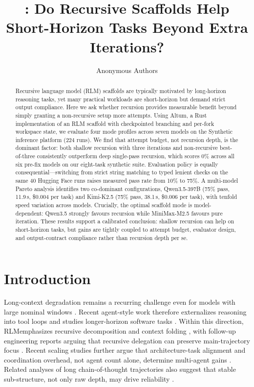 \documentclass[11pt]{article}
\title{\altum: Do Recursive Scaffolds Help Short-Horizon Tasks Beyond Extra Iterations?}
\author{Anonymous Authors}
\date{}
\newcommand{\rlm}{RLM}
\begin{document}
\maketitle

\begin{abstract}
Recursive language model (RLM) scaffolds are typically motivated by long-horizon reasoning tasks, yet many practical workloads are short-horizon but demand strict output compliance. Here we ask whether recursion provides measurable benefit beyond simply granting a non-recursive setup more attempts. Using Altum, a Rust implementation of an RLM scaffold with checkpointed branching and per-fork workspace state, we evaluate four mode profiles across seven models on the Synthetic inference platform (224 runs). We find that attempt budget, not recursion depth, is the dominant factor: both shallow recursion with three iterations and non-recursive best-of-three consistently outperform deep single-pass recursion, which scores 0\% across all six pre-fix models on our eight-task synthetic suite. Evaluation policy is equally consequential---switching from strict string matching to typed lenient checks on the same 40 Hugging Face runs raises measured pass rate from 10\% to 75\%. A multi-model Pareto analysis identifies two co-dominant configurations, Qwen3.5-397B (75\% pass, 11.9\,s, \$0.004 per task) and Kimi-K2.5 (75\% pass, 38.1\,s, \$0.006 per task), with tenfold speed variation across models. Crucially, the optimal scaffold mode is model-dependent: Qwen3.5 strongly favours recursion while MiniMax-M2.5 favours pure iteration. These results support a calibrated conclusion: shallow recursion can help on short-horizon tasks, but gains are tightly coupled to attempt budget, evaluator design, and output-contract compliance rather than recursion depth per se.
\end{abstract}

\section{Introduction}
Long-context degradation remains a recurring challenge even for models with large nominal windows \cite{hong2025contextrot}. Recent agent-style work therefore externalizes reasoning into tool loops \cite{yao2023react,wang2024codeact} and studies longer-horizon software tasks \cite{jimenez2024swebench,metr2025rebench}. Within this direction, \rlm emphasizes recursive decomposition and context folding \cite{zhang2025rlm}, with follow-up engineering reports arguing that recursive delegation can preserve main-trajectory focus \cite{primeintellect2026rlm}. Recent scaling studies further argue that architecture-task alignment and coordination overhead, not agent count alone, determine multi-agent gains \cite{kim2025scaling,google2026agentscaling}. Related analyses of long chain-of-thought trajectories also suggest that stable sub-structure, not only raw depth, may drive reliability \cite{chen2026molecular}.
\end{document}
